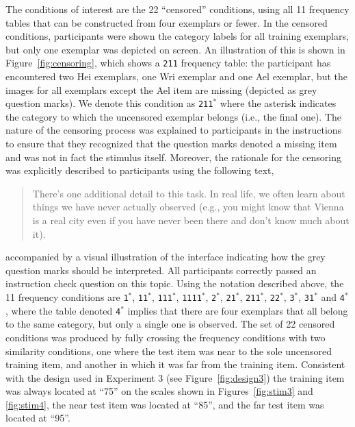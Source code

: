 \documentclass[doc]{apa6}
\newcommand{\dist}[1]{\texttt{#1}}
\begin{document}
The conditions of interest are the 22 ``censored'' conditions, using all 11 frequency tables that can be constructed from four exemplars or fewer. In the censored conditions, participants were shown the category labels for all training exemplars, but only one exemplar was  depicted on screen. An illustration of this is shown in Figure~\ref{fig:censoring}, which shows a \dist{211} frequency table: the participant has encountered two Hei exemplars, one Wri exemplar and one Ael exemplar, but the images for all exemplars except the Ael item are missing (depicted as grey question marks). We denote this condition as \dist{211$^*$} where the asterisk indicates the category to which the uncensored exemplar belongs (i.e., the final one). The nature of the censoring process was explained to participants in the instructions to ensure that they recognized that the question marks denoted a missing item and was not in fact the stimulus itself. Moreover, the rationale for the censoring was explicitly described to participants using the following text,
\begin{quote}
There's one additional detail to this task. In real life, we often learn about things we have never actually observed (e.g., you might know that Vienna is a real city even if you have never been there and don't know much about it).
\end{quote}
accompanied by a visual illustration of the interface indicating how the grey question marks should be interpreted. All participants correctly passed an instruction check question on this topic. Using the notation described above, the 11 frequency conditions are \dist{1$^*$}, \dist{11$^*$}, \dist{111$^*$}, \dist{1111$^*$}, \dist{2$^*$}, \dist{21$^*$}, \dist{211$^*$}, \dist{22$^*$}, \dist{3$^*$}, \dist{31$^*$} and \dist{4$^*$}, where the table denoted \dist{4$^*$} implies that there are four exemplars that all belong to the same category, but only a single one is observed. The set of 22 censored conditions was produced by fully crossing the frequency conditions with two similarity conditions, one where the test item was near to the sole uncensored training item, and another in which it was far from the training item. Consistent with the design used in Experiment 3 (see Figure~\ref{fig:design3}) the training item was always located at ``75'' on the scales shown in Figures~\ref{fig:stim3} and \ref{fig:stim4}, the near test item was located at ``85'', and the far test item was located at ``95''.
\end{document}

